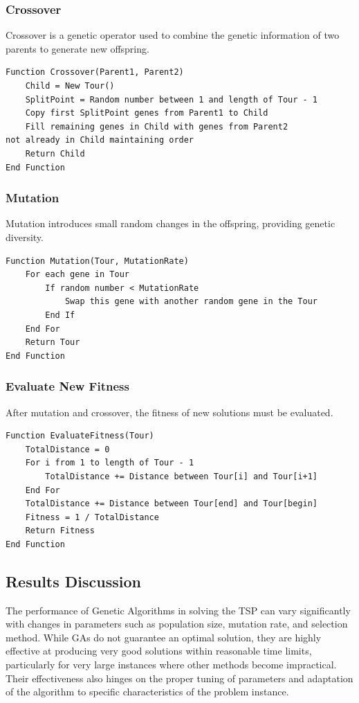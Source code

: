\documentclass[12pt, a4paper]{article}
\begin{document}
\subsubsection*{Crossover}
Crossover is a genetic operator used to combine the genetic information of two
parents to generate new offspring.
\begin{verbatim}
Function Crossover(Parent1, Parent2)
    Child = New Tour()
    SplitPoint = Random number between 1 and length of Tour - 1
    Copy first SplitPoint genes from Parent1 to Child
    Fill remaining genes in Child with genes from Parent2 
not already in Child maintaining order
    Return Child
End Function
\end{verbatim}

\subsubsection*{Mutation}
Mutation introduces small random changes in the offspring, providing genetic
diversity.
\begin{verbatim}
Function Mutation(Tour, MutationRate)
    For each gene in Tour
        If random number < MutationRate
            Swap this gene with another random gene in the Tour
        End If
    End For
    Return Tour
End Function
\end{verbatim}

\subsubsection*{Evaluate New Fitness}
After mutation and crossover, the fitness of new solutions must be evaluated.
\begin{verbatim}
Function EvaluateFitness(Tour)
    TotalDistance = 0
    For i from 1 to length of Tour - 1
        TotalDistance += Distance between Tour[i] and Tour[i+1]
    End For
    TotalDistance += Distance between Tour[end] and Tour[begin]
    Fitness = 1 / TotalDistance
    Return Fitness
End Function
\end{verbatim}


\subsection{Results Discussion}
The performance of Genetic Algorithms in solving the TSP can vary significantly
with changes in parameters such as population size, mutation rate, and selection
method. While GAs do not guarantee an optimal solution, they are highly
effective at producing very good solutions within reasonable time limits,
particularly for very large instances where other methods become impractical.
Their effectiveness also hinges on the proper tuning of parameters and
adaptation of the algorithm to specific characteristics of the problem instance.
\end{document}
